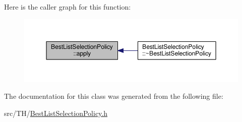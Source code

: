 Here is the caller graph for this function\+:\nopagebreak
\begin{figure}[H]
\begin{center}
\leavevmode
\includegraphics[width=350pt]{classBestListSelectionPolicy_ae387a1ef0a3a597134edf198e5ab1299_icgraph}
\end{center}
\end{figure}




The documentation for this class was generated from the following file\+:\begin{DoxyCompactItemize}
\item 
src/\+T\+H/\hyperlink{BestListSelectionPolicy_8h}{Best\+List\+Selection\+Policy.\+h}\end{DoxyCompactItemize}
